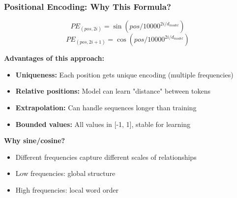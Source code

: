 \begin{frame}[fragile]\frametitle{Positional Encoding: Why This Formula?}

$$PE_{(pos,2i)} = \sin(pos/10000^{2i/d_{model}})$$
$$PE_{(pos,2i+1)} = \cos(pos/10000^{2i/d_{model}})$$

\textbf{Advantages of this approach:}
\begin{itemize}
\item \textbf{Uniqueness:} Each position gets unique encoding (multiple frequencies)
\item \textbf{Relative positions:} Model can learn "distance" between tokens
\item \textbf{Extrapolation:} Can handle sequences longer than training
\item \textbf{Bounded values:} All values in [-1, 1], stable for learning
\end{itemize}

\textbf{Why sine/cosine?}
\begin{itemize}
\item Different frequencies capture different scales of relationships
\item Low frequencies: global structure
\item High frequencies: local word order
\end{itemize}
\end{frame}

